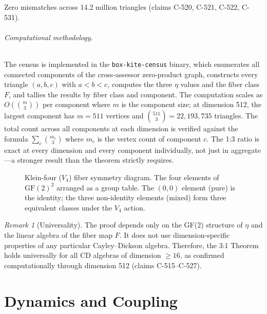 \documentclass[12pt,openany]{report}
\theoremstyle{definition}
\theoremstyle{plain}
\theoremstyle{remark}
\newtheorem{remark}{Remark}[chapter]
\begin{document}
Zero mismatches across 14.2 million triangles (claims C-520, C-521, C-522,
C-531).

\paragraph{Computational methodology.}
The census is implemented in the \texttt{box-kite-census} binary, which
enumerates all connected components of the cross-assessor zero-product
graph, constructs every triangle $(a, b, c)$ with $a < b < c$, computes
the three $\eta$ values and the fiber class $F$, and tallies the results
by fiber class and component.  The computation scales as
$O(\binom{m}{3})$ per component where $m$ is the component size; at
dimension 512, the largest component has $m = 511$ vertices and
$\binom{511}{3} = 22{,}193{,}735$ triangles.  The total count across all
components at each dimension is verified against the formula
$\sum_c \binom{m_c}{3}$ where $m_c$ is the vertex count of component $c$.
The 1:3 ratio is exact at every dimension and every component individually,
not just in aggregate---a stronger result than the theorem strictly
requires.

\begin{figure}[htbp]
\centering

\caption{Klein-four ($V_4$) fiber symmetry diagram.  The four elements
of $\mathrm{GF}(2)^2$ arranged as a group table.  The $(0,0)$ element
(pure) is the identity; the three non-identity elements (mixed) form
three equivalent classes under the $V_4$ action.}
\label{fig:klein-four}
\end{figure}

\begin{remark}[Universality]
The proof depends only on the GF(2) structure of $\eta$ and the linear
algebra of the fiber map $F$.  It does not use dimension-specific
properties of any particular Cayley--Dickson algebra.  Therefore, the
3:1 Theorem holds universally for all CD algebras of dimension $\geq 16$,
as confirmed computationally through dimension 512 (claims C-515--C-527).
\end{remark}


\part{Dynamics and Coupling}
\label{part:dynamics}
\end{document}
